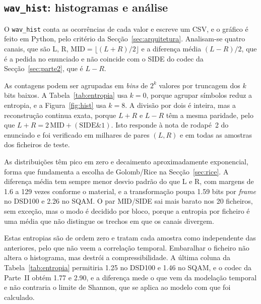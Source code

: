 \documentclass[a4paper,11pt]{article}
\newcommand{\prog}[1]{\texttt{#1}}
\begin{document}
\subsection{\prog{wav\_hist}: histogramas e análise}
\label{sec:hist}
O \prog{wav\_hist} conta as ocorrências de cada valor e escreve um CSV, e o
gráfico é feito em Python, pelo critério da Secção~\ref{sec:arquitetura}.
Analisam-se quatro canais, que são L, R, $\mathrm{MID} = \lfloor (L+R)/2 \rfloor$ e a
diferença média $(L-R)/2$, que é a pedida no enunciado e não coincide com o SIDE
do codec da Secção~\ref{sec:parte2}, que é $L-R$.

As contagens podem ser agrupadas em \emph{bins} de $2^k$ valores por truncagem
dos $k$ bits baixos. A Tabela~\ref{tab:entropia} usa $k=0$, porque agrupar
símbolos reduz a entropia, e a Figura~\ref{fig:hist} usa $k=8$. A divisão por
dois é inteira, mas a reconstrução continua exata, porque $L+R$ e $L-R$ têm a mesma
paridade, pelo que $L+R = 2\,\mathrm{MID} + (\mathrm{SIDE} \mathbin{\&} 1)$.
Isto responde à nota de rodapé~2 do enunciado e foi verificado em milhares de
pares $(L,R)$ e em todas as amostras dos ficheiros de teste.

As distribuições têm pico em zero e decaimento aproximadamente exponencial,
forma que fundamenta a escolha de Golomb/Rice na Secção~\ref{sec:rice}. A
diferença média tem sempre menor desvio padrão do que L e R, com margens de
\num{1,6} a \num{129} vezes conforme o material, e a transformação poupa
\num{1,59} bits por \emph{frame} no DSD100 e \num{2,26} no SQAM. O par MID/SIDE
sai mais barato nos 20 ficheiros, sem exceção, mas o modo é decidido por
bloco, porque a entropia por ficheiro é uma média que não distingue os trechos
em que os canais divergem.

Estas entropias são de ordem zero e tratam cada amostra como independente das
anteriores, pelo que não veem a correlação temporal. Embaralhar o ficheiro não
altera o histograma, mas destrói a compressibilidade. A última coluna da
Tabela~\ref{tab:entropia} permitiria \num{1,25} no DSD100 e \num{1,46} no SQAM,
e o codec da Parte~II obtém \num{1,77} e \num{2,90}, e a diferença mede o que vem
da modelação temporal e não contraria o limite de Shannon, que se aplica ao
modelo com que foi calculado.
\end{document}
